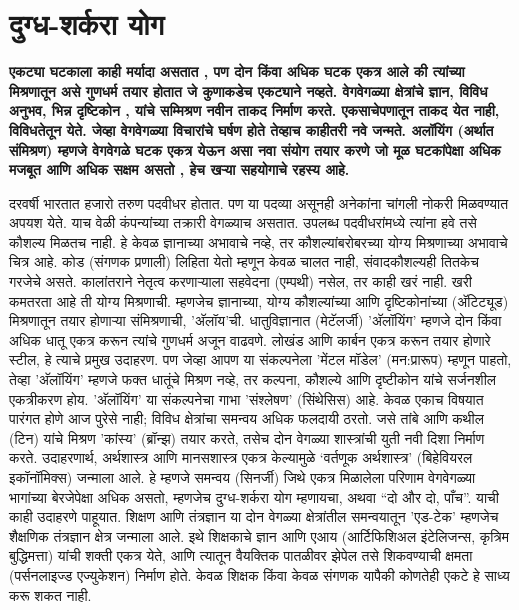 \chapter{दुग्ध-शर्करा योग }

\textcolor{blue!60!black}{\textbf{एकट्या घटकाला काही मर्यादा असतात , पण दोन किंवा अधिक घटक एकत्र आले की त्यांच्या मिश्रणातून असे गुणधर्म तयार होतात जे कुणाकडेच एकट्याने नव्हते. वेगवेगळ्या क्षेत्रांचे ज्ञान, विविध अनुभव, भिन्न दृष्टिकोन , यांचे सम्मिश्रण नवीन ताकद निर्माण करते. एकसाचेपणातून ताकद येत नाही, विविधतेतून येते. जेव्हा वेगवेगळ्या विचारांचे घर्षण होते तेव्हाच काहीतरी नवे जन्मते. अलॉयिंग (अर्थात संमिश्रण) म्हणजे वेगवेगळे घटक एकत्र येऊन असा नवा संयोग तयार करणे जो मूळ घटकांपेक्षा अधिक मजबूत आणि अधिक सक्षम असतो , हेच खऱ्या सहयोगाचे रहस्य आहे.}}

दरवर्षी भारतात हजारो तरुण पदवीधर होतात. पण या पदव्या असूनही अनेकांना चांगली नोकरी मिळवण्यात अपयश येते. याच वेळी कंपन्यांच्या तक्रारी वेगळ्याच असतात. उपलब्ध पदवीधरांमध्ये त्यांना हवे तसे कौशल्य मिळतच नाही. हे केवळ ज्ञानाच्या अभावाचे नव्हे, तर कौशल्यांबरोबरच्या योग्य मिश्रणाच्या अभावाचे चित्र आहे. कोड (संगणक प्रणाली) लिहिता येतो म्हणून केवळ चालत नाही, संवादकौशल्यही तितकेच गरजेचे असते. कालांतराने नेतृत्व करणाऱ्याला सहवेदना (एम्पथी) नसेल, तर काही खरं  नाही. खरी कमतरता आहे ती योग्य मिश्रणाची. म्हणजेच ज्ञानाच्या, योग्य कौशल्यांच्या आणि दृष्टिकोनांच्या (अ‍ॅटिट्यूड) मिश्रणातून तयार होणाऱ्या संमिश्रणाची, 'अ‍ॅलॉय'ची.
धातुविज्ञानात (मेटॅलर्जी) 'अ‍ॅलॉयिंग' म्हणजे दोन किंवा अधिक धातू एकत्र करून त्यांचे गुणधर्म अजून वाढवणे. लोखंड आणि कार्बन एकत्र करून तयार होणारे स्टील, हे त्याचे प्रमुख उदाहरण. पण जेव्हा आपण या संकल्पनेला 'मेंटल मॉडेल' (मन:प्रारूप) म्हणून पाहतो, तेव्हा 'अ‍ॅलॉयिंग' म्हणजे फक्त धातूंचे मिश्रण नव्हे, तर कल्पना, कौशल्ये आणि दृष्टीकोन यांचे सर्जनशील एकत्रीकरण होय.
'अ‍ॅलॉयिंग' या संकल्पनेचा गाभा 'संश्लेषण' (सिंथेसिस) आहे. केवळ एकाच विषयात पारंगत होणे आज पुरेसे नाही; विविध क्षेत्रांचा समन्वय अधिक फलदायी ठरतो. जसे तांबे आणि कथील (टिन) यांचे मिश्रण 'कांस्य' (ब्रॉन्झ) तयार करते, तसेच दोन वेगळ्या शास्त्रांची युती नवी दिशा निर्माण करते. उदाहरणार्थ, अर्थशास्त्र आणि मानसशास्त्र एकत्र केल्यामुळे ‘वर्तणूक अर्थशास्त्र' (बिहेवियरल इकॉनॉमिक्स) जन्माला आले. हे म्हणजे समन्वय (सिनर्जी) जिथे एकत्र मिळालेला परिणाम वेगवेगळ्या भागांच्या बेरजेपेक्षा अधिक असतो, म्हणजेच दुग्ध-शर्करा योग म्हणायचा, अथवा  “दो और दो, पाँच”. याची काही उदाहरणे पाहूयात.
शिक्षण आणि तंत्रज्ञान या दोन वेगळ्या क्षेत्रांतील समन्वयातून 'एड-टेक' म्हणजेच शैक्षणिक तंत्रज्ञान क्षेत्र जन्माला आले. इथे शिक्षकाचे ज्ञान आणि एआय (आर्टिफिशिअल इंटेलिजन्स, कृत्रिम बुद्धिमत्ता) यांची शक्ती एकत्र येते, आणि त्यातून वैयक्तिक पातळीवर झेपेल तसे शिकवण्याची क्षमता (पर्सनलाइज्ड एज्युकेशन) निर्माण होते. केवळ शिक्षक किंवा केवळ संगणक यापैकी कोणतेही एकटे हे साध्य करू शकत नाही.

